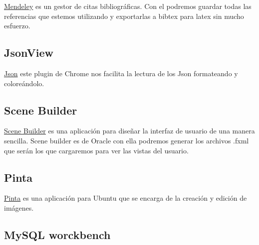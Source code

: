 \href{https://www.mendeley.com/}{Mendeley} es un gestor de citas bibliográficas. Con el podremos guardar todas las referencias que estemos utilizando y exportarlas a bibtex para latex sin mucho esfuerzo.

\subsection{JsonView}\label{jsonview}

\href{https://chrome.google.com/webstore/detail/jsonview/chklaanhfefbnpoihckbnefhakgolnmc}{Json} este plugin de Chrome nos facilita la lectura de los Json formateando y coloreándolo.

\subsection{Scene Builder}\label{scene-builder}

\href{http://www.oracle.com/technetwork/java/javase/downloads/javafxscenebuilder-info-2157684.html}{Scene Builder} es una aplicación para diseñar la interfaz de usuario de una manera sencilla. Scene builder es de Oracle con ella podremos generar los archivos .fxml que serán los que cargaremos para ver las vistas del usuario.

\subsection{Pinta}\label{pinta}

\href{https://pinta-project.com/pintaproject/pinta/}{Pinta} es una aplicación para Ubuntu que se encarga de la creación y edición de imágenes.

\subsection{MySQL worckbench}\label{pinta}
